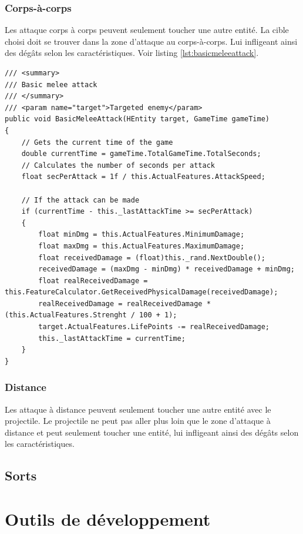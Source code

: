 \documentclass[11pt, a4paper, oneside]{report}
\begin{document}
\subsubsection{Corps-à-corps}
Les attaque corps à corps peuvent seulement toucher une autre entité. La cible choisi doit se trouver dans la zone d'attaque au corps-à-corps. Lui infligeant ainsi des dégâts selon les caractéristiques. Voir listing \ref{lst:basicmeleeattack}.
\begin{lstlisting}[caption=Attaque au corps-à-corps, label=lst:basicmeleeattack]
/// <summary>
/// Basic melee attack
/// </summary>
/// <param name="target">Targeted enemy</param>
public void BasicMeleeAttack(HEntity target, GameTime gameTime)
{
	// Gets the current time of the game
	double currentTime = gameTime.TotalGameTime.TotalSeconds;
	// Calculates the number of seconds per attack
	float secPerAttack = 1f / this.ActualFeatures.AttackSpeed;
	
	// If the attack can be made
	if (currentTime - this._lastAttackTime >= secPerAttack)
	{
		float minDmg = this.ActualFeatures.MinimumDamage;
		float maxDmg = this.ActualFeatures.MaximumDamage;
		float receivedDamage = (float)this._rand.NextDouble();
		receivedDamage = (maxDmg - minDmg) * receivedDamage + minDmg;
		float realReceivedDamage = this.FeatureCalculator.GetReceivedPhysicalDamage(receivedDamage);
		realReceivedDamage = realReceivedDamage * (this.ActualFeatures.Strenght / 100 + 1);
		target.ActualFeatures.LifePoints -= realReceivedDamage;
		this._lastAttackTime = currentTime;
	}
}
\end{lstlisting}
\subsubsection{Distance}
Les attaque à distance peuvent seulement toucher une autre entité avec le projectile. Le projectile ne peut pas aller plus loin que le zone d'attaque à distance et peut seulement toucher une entité, lui infligeant ainsi des dégâts selon les caractéristiques.
\subsection{Sorts}
\section{Outils de développement}
\end{document}
